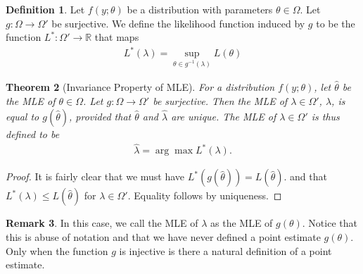 \documentclass[11pt]{amsart}
\newtheorem{theorem}{Theorem}[section]
\theoremstyle{definition}
\newtheorem{definition}[theorem]{Definition}
\newtheorem{remark}[theorem]{Remark}
\numberwithin{equation}{section}
\begin{document}
\begin{definition}
    Let $f(y;\theta)$ be a distribution with parameters $\theta\in\Omega$. Let $g:\Omega\to\Omega'$ be surjective. We define the likelihood function induced by $g$ to be the function $L^*:\Omega'\to\mathbb R$ that maps
    \begin{align*}
        L^*(\lambda)=\sup_{\theta\in g^{-1}(\lambda)}L(\theta)
    \end{align*}
\end{definition}
\begin{theorem}[Invariance Property of MLE]
    For a distribution $f(y;\theta)$, let $\hat\theta$ be the MLE of $\theta\in\Omega$. Let $g:\Omega\to\Omega'$ be surjective. Then the MLE of $\lambda\in\Omega'$, $\hat\lambda$, is equal to $g(\hat\theta)$, provided that $\hat\theta$ and $\hat\lambda$ are unique. The MLE of $\lambda\in\Omega'$ is thus defined to be 
    \begin{align*}
        \hat\lambda=\arg\max L^*(\lambda).
    \end{align*}
\end{theorem}
\begin{proof}
    It is fairly clear that we must have $L^*(g(\hat\theta))=L(\hat\theta)$. and that $L^*(\lambda)\le L(\hat\theta)$ for $\lambda\in\Omega'$. Equality follows by uniqueness.
\end{proof}
\begin{remark}
    In this case, we call the MLE of $\lambda$ as the MLE of $g(\theta)$. Notice that this is abuse of notation and that we have never defined a point estimate $g(\theta)$. Only when the function $g$ is injective is there a natural definition of a point estimate.
\end{remark}
\end{document}
